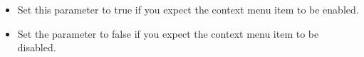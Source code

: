 
\begin{itemize}
\item Set this parameter to true if you expect the context menu item to be enabled.
\item Set the parameter to false if you expect the context menu item to be disabled. 
\end{itemize}
